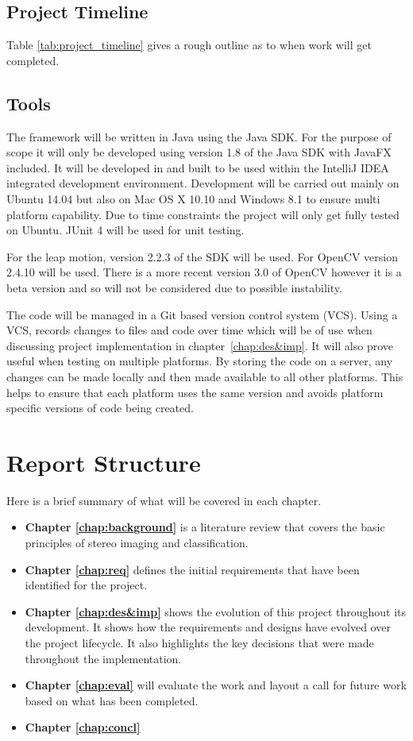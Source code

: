 \documentclass[11pt,oneside]{report}
\begin{document}
					\subsection{Project Timeline}
					Table \ref{tab:project_timeline} gives a rough outline as to when work will get completed.
					
			\subsection{Tools}
			The framework will be written in Java using the Java SDK.
			For the purpose of scope it will only be developed using version 1.8 of the Java SDK with JavaFX included.
			It will be developed in and built to be used within the IntelliJ IDEA integrated development environment.
			Development will be carried out mainly on Ubuntu 14.04 but also on Mac OS X 10.10 and Windows 8.1 to ensure multi platform capability.
			Due to time constraints the project will only get fully tested on Ubuntu.
			JUnit 4 will be used for unit testing.
			
			For the leap motion, version 2.2.3 of the SDK will be used.
			For OpenCV version 2.4.10 will be used.
			There is a more recent version 3.0 of OpenCV however it is a beta version and so will not be considered due to possible instability.
			
			The code will be managed in a Git based version control system (VCS).
			Using a VCS, records changes to files and code over time which will be of use when discussing project implementation in chapter~\ref{chap:des&imp}.
			It will also prove useful when testing on multiple platforms.
			By storing the code on a server, any changes can be made locally and then made available to all other platforms.
			This helps to ensure that each platform uses the same version and avoids platform specific versions of code being created.
			
		\section{Report Structure}
			Here is a brief summary of what will be covered in each chapter.
			\begin{itemize}
			 \item \textbf{Chapter \ref{chap:background}}
			 	is a literature review that covers the basic principles of stereo imaging and classification.
			 \item \textbf{Chapter \ref{chap:req}}
			 	defines the initial requirements that have been identified for the project.
			 \item \textbf{Chapter \ref{chap:des&imp}}
			 	shows the evolution of this project throughout its development.
			 	It shows how the requirements and designs have evolved over the project lifecycle.
			 	It also highlights the key decisions that were made throughout the implementation.
			 	
			 \item \textbf{Chapter \ref{chap:eval}}
			 	will evaluate the work and layout a call for future work based on what has been completed.
			 \item \textbf{Chapter \ref{chap:concl}}
			 	
			\end{itemize}				
\end{document}
